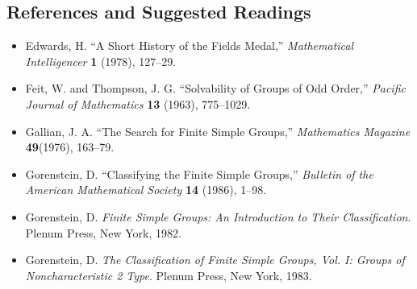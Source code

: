  
 
\subsection*{References and Suggested Readings}
 
 
{\small
\begin{itemize}
 
\item[{\bf [1]}]
Edwards, H. ``A Short History of the Fields Medal,'' {\it
Mathematical Intelligencer} {\bf 1} (1978), 127--29.
 
\item[{\bf [2]}]
Feit, W. and Thompson, J. G. ``Solvability of Groups of Odd
Order,'' {\it Pacific Journal of Mathematics} {\bf
13} (1963), 775--1029.
 
\item[{\bf [3]}]
Gallian, J. A. ``The Search for Finite Simple Groups,''
{\it Mathematics Magazine} {\bf 49}(1976), 163--79.
 
\item[{\bf [4]}]
Gorenstein, D. ``Classifying the Finite Simple Groups,''
{\it Bulletin of the American Mathematical Society} {\bf
14} (1986), 1--98.
 
\item[{\bf [5]}]
Gorenstein, D. {\it Finite Simple Groups: An Introduction to
Their Classification}. Plenum Press, New York, 1982.
 
\item[{\bf [6]}]
Gorenstein, D. {\it The Classification of Finite Simple
Groups, Vol. I: Groups of Noncharacteristic 2 Type}.
Plenum Press, New York, 1983.
 
\end{itemize}
}
 
 
 
